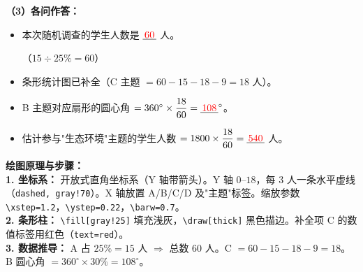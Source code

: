 \vspace{0.4cm}
\textbf{（3）各问作答：}

\begin{itemize}
    \item[\textbf{(1)}] 本次随机调查的学生人数是 $\underline{\textcolor{red}{\,60\,}}$ 人。

    （$15 \div 25\% = 60$）

    \item[\textbf{(2)}] 条形统计图已补全（C 主题 $= 60 - 15 - 18 - 9 = 18$ 人）。

    \item[\textbf{(3)}] B 主题对应扇形的圆心角 $= 360^\circ \times \dfrac{18}{60} = \underline{\textcolor{red}{\,108\,}}^\circ$。

    \item[\textbf{(4)}] 估计参与"生态环境"主题的学生人数 $= 1800 \times \dfrac{18}{60} = \underline{\textcolor{red}{\,540\,}}$ 人。
\end{itemize}

\vspace{0.4cm}
{\small\color{blue!70!black}
\textbf{绘图原理与步骤：}\\
\textbf{1. 坐标系：} 开放式直角坐标系（Y 轴带箭头）。Y 轴 $0$--$18$，每 $3$ 人一条水平虚线（\texttt{dashed, gray!70}）。X 轴放置 A/B/C/D 及"主题"标签。缩放参数 \texttt{\textbackslash{}xstep=1.2}，\texttt{\textbackslash{}ystep=0.22}，\texttt{\textbackslash{}barw=0.7}。\\
\textbf{2. 条形柱：} \texttt{\textbackslash{}fill[gray!25]} 填充浅灰，\texttt{\textbackslash{}draw[thick]} 黑色描边。补全项 C 的数值标签用红色（\texttt{text=red}）。\\
\textbf{3. 数据推导：} A 占 $25\% = 15$ 人 $\Rightarrow$ 总数 $60$ 人。C $= 60 - 15 - 18 - 9 = 18$。B 圆心角 $= 360^\circ \times 30\% = 108^\circ$。
}

\newpage
